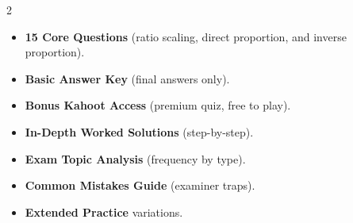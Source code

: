 \documentclass[11pt,a4paper]{article}
\newcommand{\FullReleaseDate}{April 30, 2026}
\begin{document}
\vspace{8pt}

\begin{multicols}{2}
  \begin{tcolorbox}[card, title=\sffamily\bfseries\textcolor{white}{\faHandPointDown\ TODAY (Simplified Version)}, colbacktitle=mainblue, boxed title style={sharp corners, boxrule=0pt}]
    \begin{itemize}[leftmargin=1.2em, itemsep=2pt]
      \item \small \textbf{15 Core Questions} (ratio scaling, direct proportion, and inverse proportion).
      \item \small \textbf{Basic Answer Key} (final answers only).
      \item \small \textbf{Bonus Kahoot Access} (premium quiz, free to play).
    \end{itemize}
  \end{tcolorbox}

  \columnbreak

  \begin{tcolorbox}[card, title=\sffamily\bfseries\textcolor{white}{\faRocket\ ON \FullReleaseDate\ (Full Upgrade)}, colbacktitle=mainblue, boxed title style={sharp corners, boxrule=0pt}]
    \begin{itemize}[leftmargin=1.2em, itemsep=2pt]
      \item \small \textbf{In-Depth Worked Solutions} (step-by-step).
      \item \small \textbf{Exam Topic Analysis} (frequency by type).
      \item \small \textbf{Common Mistakes Guide} (examiner traps).
      \item \small \textbf{Extended Practice} variations.
    \end{itemize}
  \end{tcolorbox}
\end{multicols}
\end{document}
